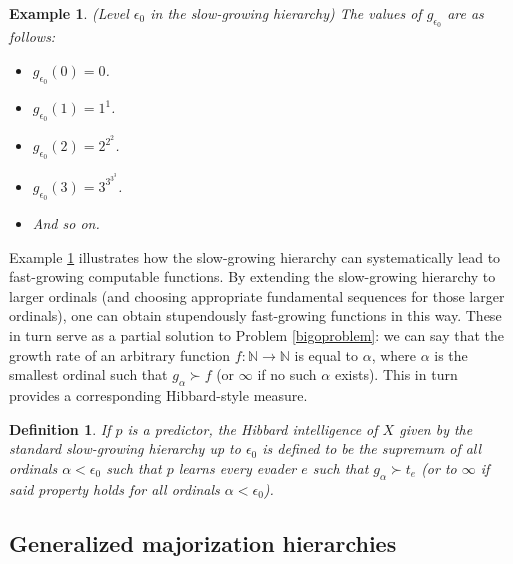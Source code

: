 \documentclass{article}
\newtheorem{definition}[theorem]{Definition}
\newtheorem{example}[theorem]{Example}
\begin{document}
\begin{example}
\label{epsilon0example}
(Level $\epsilon_0$ in the slow-growing hierarchy)
The values of $g_{\epsilon_0}$ are as follows:
\begin{itemize}
    \item
    $g_{\epsilon_0}(0)=0$.
    \item
    $g_{\epsilon_0}(1)=1^1$.
    \item
    $g_{\epsilon_0}(2)=2^{2^2}$.
    \item
    $g_{\epsilon_0}(3)=3^{3^{3^3}}$.
    \item
    And so on.
\end{itemize}
\end{example}

Example \ref{epsilon0example} illustrates how the slow-growing hierarchy can systematically
lead to fast-growing computable functions. By extending the slow-growing hierarchy to
larger ordinals (and choosing appropriate fundamental sequences for those larger ordinals),
one can obtain stupendously fast-growing functions in this way. These in turn serve as
a partial solution to Problem \ref{bigoproblem}: we can say that the growth rate of
an arbitrary function $f:\mathbb N\to\mathbb N$
is equal to $\alpha$, where $\alpha$ is the smallest ordinal such
that $g_\alpha\succ f$ (or $\infty$ if no such $\alpha$ exists).
This in turn provides a corresponding Hibbard-style measure.

\begin{definition}
\label{tradmajorizationhierarchyhibbardmeasuredefn}
    If $p$ is a predictor, the \emph{Hibbard intelligence of $X$ given by the
    standard slow-growing hierarchy up to $\epsilon_0$} is defined to be the
    supremum of all ordinals $\alpha<\epsilon_0$ such that
    $p$ learns every evader $e$ such that $g_\alpha\succ t_e$ (or to
    $\infty$ if said property holds for all ordinals $\alpha<\epsilon_0$).
\end{definition}

\subsection{Generalized majorization hierarchies}
\end{document}
